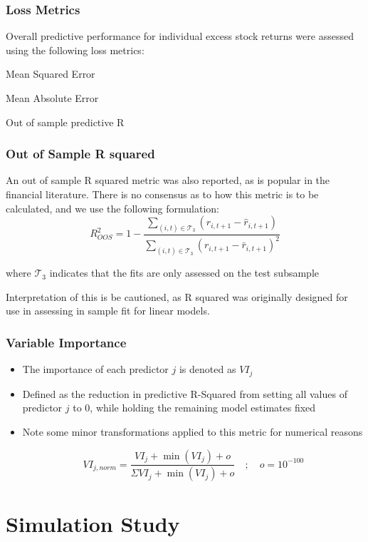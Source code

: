 \documentclass[]{beamer}
\begin{document}
\begin{frame}
	\frametitle{Loss Metrics}
	
	Overall predictive performance for individual excess stock returns were assessed using the following loss metrics:
	
	Mean Squared Error
	
	Mean Absolute Error
	
	Out of sample predictive R
	
\begin{frame}
\frametitle{Out of Sample R squared}
		
An out of sample R squared metric was also reported, as is popular in the financial literature. There is no consensus as to how this metric is to be calculated, and we use the following formulation:
\begin{equation}
R^2_{OOS} = 
	1 - 
	\frac{\sum_{(i, t)\in\mathcal{T}_3}(r_{i, t+1} - \widehat{r}_{i, t+1})}
	{\sum_{(i, t)\in\mathcal{T}_3} \left( r_{i, t+1} - \bar{r}_{i, t+1} \right) ^2}
\end{equation}
		
where $\mathcal{T}_3$ indicates that the fits are only assessed on the test subsample
		
Interpretation of this is be cautioned, as R squared was originally designed for use in assessing in sample fit for linear models.
\end{frame}
	
\begin{frame}
\frametitle{Variable Importance}	
\begin{itemize}
	\item The importance of each predictor $j$ is denoted as $VI_j$
	\item Defined as the reduction in predictive R-Squared from setting all values of predictor $j$ to 0, while holding the remaining model estimates fixed
	\item Note some minor transformations applied to this metric for numerical reasons
			
	\begin{equation}
	VI_{j, norm} = \frac{VI_j + \operatorname{min}(VI_j) + o}
	{\Sigma VI_j + \operatorname{min}(VI_j) + o} \quad ; \quad o = 10^{-100}
		\end{equation}
	\end{itemize}
\end{frame}

\section{Simulation Study}


\end{frame}
\end{document}
